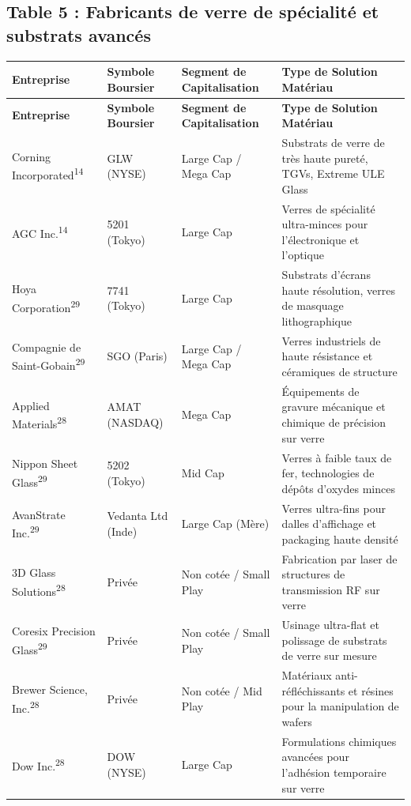 \documentclass[11pt,a4paper]{article}
\begin{document}
\subsection*{Table 5 : Fabricants de verre de spécialité et substrats avancés}
\begin{longtable}{p{3cm} p{3.5cm} p{3cm} p{5cm}}
\toprule
\textbf{Entreprise} & \textbf{Symbole Boursier} & \textbf{Segment de Capitalisation} & \textbf{Type de Solution Matériau} \\
\midrule
\endfirsthead
\toprule
\textbf{Entreprise} & \textbf{Symbole Boursier} & \textbf{Segment de Capitalisation} & \textbf{Type de Solution Matériau} \\
\midrule
\endhead
Corning Incorporated\textsuperscript{14} & GLW (NYSE) & Large Cap / Mega Cap & Substrats de verre de très haute pureté, TGVs, Extreme ULE Glass \\
AGC Inc.\textsuperscript{14} & 5201 (Tokyo) & Large Cap & Verres de spécialité ultra-minces pour l'électronique et l'optique \\
Hoya Corporation\textsuperscript{29} & 7741 (Tokyo) & Large Cap & Substrats d'écrans haute résolution, verres de masquage lithographique \\
Compagnie de Saint-Gobain\textsuperscript{29} & SGO (Paris) & Large Cap / Mega Cap & Verres industriels de haute résistance et céramiques de structure \\
Applied Materials\textsuperscript{28} & AMAT (NASDAQ) & Mega Cap & Équipements de gravure mécanique et chimique de précision sur verre \\
Nippon Sheet Glass\textsuperscript{29} & 5202 (Tokyo) & Mid Cap & Verres à faible taux de fer, technologies de dépôts d'oxydes minces \\
AvanStrate Inc.\textsuperscript{29} & Vedanta Ltd (Inde) & Large Cap (Mère) & Verres ultra-fins pour dalles d'affichage et packaging haute densité \\
3D Glass Solutions\textsuperscript{28} & Privée & Non cotée / Small Play & Fabrication par laser de structures de transmission RF sur verre \\
Coresix Precision Glass\textsuperscript{29} & Privée & Non cotée / Small Play & Usinage ultra-flat et polissage de substrats de verre sur mesure \\
Brewer Science, Inc.\textsuperscript{28} & Privée & Non cotée / Mid Play & Matériaux anti-réfléchissants et résines pour la manipulation de wafers \\
Dow Inc.\textsuperscript{28} & DOW (NYSE) & Large Cap & Formulations chimiques avancées pour l'adhésion temporaire sur verre \\

\end{longtable}
\end{document}
